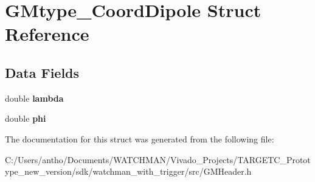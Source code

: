 \section{G\+Mtype\+\_\+\+Coord\+Dipole Struct Reference}
\label{struct_g_mtype___coord_dipole}
\subsection*{Data Fields}
\begin{DoxyCompactItemize}
\item 
\mbox{\label{struct_g_mtype___coord_dipole_a3db359547eed8cfd48ca821d95f577af}} 
double {\bfseries lambda}
\item 
\mbox{\label{struct_g_mtype___coord_dipole_adae8d8a6ff28515e505bb1c07f2b33c8}} 
double {\bfseries phi}
\end{DoxyCompactItemize}


The documentation for this struct was generated from the following file\+:\begin{DoxyCompactItemize}
\item 
C\+:/\+Users/antho/\+Documents/\+W\+A\+T\+C\+H\+M\+A\+N/\+Vivado\+\_\+\+Projects/\+T\+A\+R\+G\+E\+T\+C\+\_\+\+Prototype\+\_\+new\+\_\+version/sdk/watchman\+\_\+with\+\_\+trigger/src/G\+M\+Header.\+h\end{DoxyCompactItemize}
